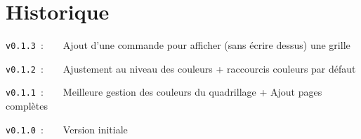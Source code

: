 \documentclass[a4paper]{article}
\begin{document}
\pagebreak

\section{Historique}

\verb|v0.1.3|~:~~~~Ajout d'une commande pour afficher (sans écrire dessus) une grille

\verb|v0.1.2|~:~~~~Ajustement au niveau des couleurs + raccourcis couleurs par défaut

\verb|v0.1.1|~:~~~~Meilleure gestion des couleurs du quadrillage + Ajout pages complètes

\verb|v0.1.0|~:~~~~Version initiale
\end{document}
